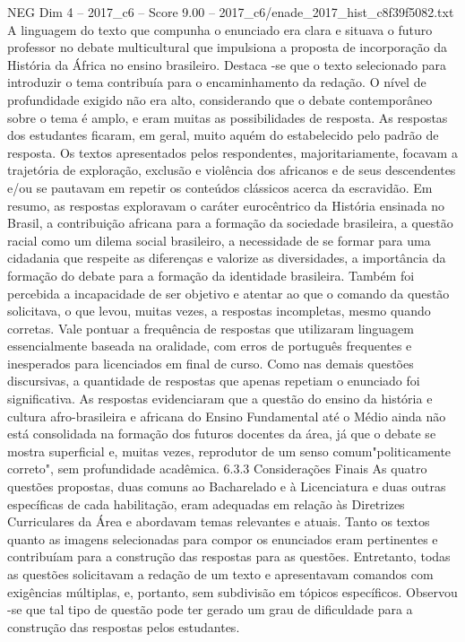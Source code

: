 \begin{textsample}{NEG Dim 4 – 2017\_c6 – Score 9.00 – 2017\_c6/enade\_2017\_hist\_c8f39f5082.txt}
A linguagem do texto que compunha o enunciado era clara e situava o futuro professor no debate multicultural que impulsiona a proposta de incorporação da História da África no ensino brasileiro.
Destaca -se que o texto selecionado para introduzir o tema contribuía para o encaminhamento da redação.
O nível de profundidade exigido não era alto, considerando que o debate contemporâneo sobre o tema é amplo, e eram muitas as possibilidades de resposta.
As respostas dos estudantes ficaram, em geral, muito aquém do estabelecido pelo padrão de resposta.
Os textos apresentados pelos respondentes, majoritariamente, focavam a trajetória de exploração, exclusão e violência dos africanos e de seus descendentes e/ou se pautavam em repetir os conteúdos clássicos acerca da escravidão.
Em resumo, as respostas exploravam o caráter eurocêntrico da História ensinada no Brasil, a contribuição africana para a formação da sociedade brasileira, a questão racial como um dilema social brasileiro, a necessidade de se formar para uma cidadania que respeite as diferenças e valorize as diversidades, a importância da formação do debate para a formação da identidade brasileira.
Também foi percebida a incapacidade de ser objetivo e atentar ao que o comando da questão solicitava, o que levou, muitas vezes, a respostas incompletas, mesmo quando corretas.
Vale pontuar a frequência de respostas que utilizaram linguagem essencialmente baseada na oralidade, com erros de português frequentes e inesperados para licenciados em final de curso.
Como nas demais questões discursivas, a quantidade de respostas que apenas repetiam o enunciado foi significativa.
As respostas evidenciaram que a questão do ensino da história e cultura afro-brasileira e africana do Ensino Fundamental até o Médio ainda não está consolidada na formação dos futuros docentes da área, já que o debate se mostra superficial e, muitas vezes, reprodutor de um senso comum"politicamente correto", sem profundidade acadêmica. 6.3.3 Considerações Finais As quatro questões propostas, duas comuns ao Bacharelado e à Licenciatura e duas outras específicas de cada habilitação, eram adequadas em relação às Diretrizes Curriculares da Área e abordavam temas relevantes e atuais.
Tanto os textos quanto as imagens selecionadas para compor os enunciados eram pertinentes e contribuíam para a construção das respostas para as questões.
Entretanto, todas as questões solicitavam a redação de um texto e apresentavam comandos com exigências múltiplas, e, portanto, sem subdivisão em tópicos específicos.
Observou -se que tal tipo de questão pode ter gerado um grau de dificuldade para a construção das respostas pelos estudantes.

\end{textsample}
